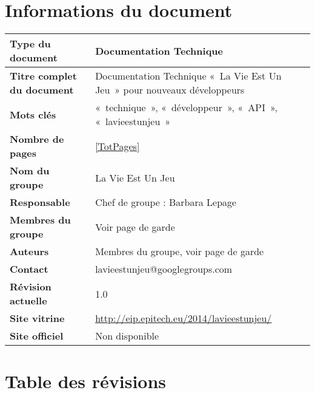\documentclass{life-fr}
\begin{document}

\chapter*{Informations du document}

\begin{tabular}{ | m{5cm} | m{10cm} | }
  \hline
  \textbf{Type du document} & Documentation Technique\\ %
  \hline
  \textbf{Titre complet du document} & Documentation Technique «~La Vie Est Un Jeu~» pour nouveaux développeurs\\ %
  \hline
  \textbf{Mots clés} & «~technique~», «~développeur~», «~API~», «~lavieestunjeu~»\\ %
  \hline
  \textbf{Nombre de pages} & \ref{TotPages} \\
  \hline
  \textbf{Nom du groupe} & La Vie Est Un Jeu\\
  \hline
  \textbf{Responsable} & Chef de groupe : Barbara Lepage\\
  \hline
  \textbf{Membres du groupe} & Voir page de garde\\
  \hline
  \textbf{Auteurs} & Membres du groupe, voir page de garde\\
  \hline
  \textbf{Contact} & lavieestunjeu@googlegroups.com\\
  \hline
  \textbf{Révision actuelle} & 1.0\\ %
  \hline
  \textbf{Site vitrine} & \url{http://eip.epitech.eu/2014/lavieestunjeu/}\\
  \hline
  \textbf{Site officiel} & Non disponible\\
  \hline
\end{tabular}


\chapter*{Table des révisions}

\listofrevisions
\end{document}
